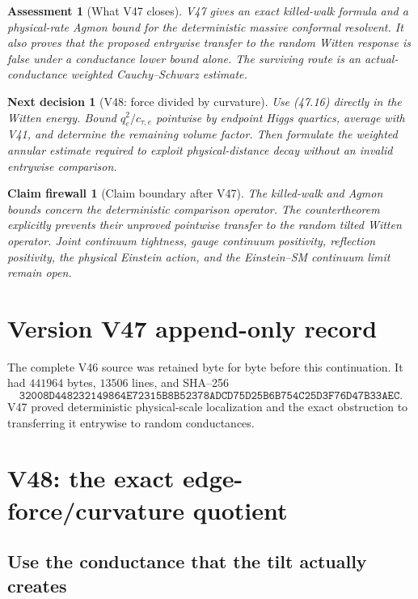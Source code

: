 \documentclass[11pt]{article}
\newtheorem{firewall}[theorem]{Claim firewall}
\newtheorem{decision}[theorem]{Next decision}
\newtheorem{assessment}[theorem]{Assessment}
\theoremstyle{remark}
\begin{document}
\begin{assessment}[What V47 closes]
\label{ass:v17v47-status}
V47 gives an exact killed-walk formula and a physical-rate Agmon bound
for the deterministic massive conformal resolvent.  It also proves
that the proposed entrywise transfer to the random Witten response is
false under a conductance lower bound alone.  The surviving route is
an actual-conductance weighted Cauchy--Schwarz estimate.
\end{assessment}

\begin{decision}[V48: force divided by curvature]
\label{dec:v17v47-next}
Use (47.16) directly in the Witten energy.  Bound
\(q_e^2/c_{\tau,e}\) pointwise by endpoint Higgs quartics, average with
V41, and determine the remaining volume factor.  Then formulate the
weighted annular estimate required to exploit physical-distance decay
without an invalid entrywise comparison.
\end{decision}

\begin{firewall}[Claim boundary after V47]
\label{fire:v17v47}
The killed-walk and Agmon bounds concern the deterministic comparison
operator.  The countertheorem explicitly prevents their unproved
pointwise transfer to the random tilted Witten operator.  Joint
continuum tightness, gauge continuum positivity, reflection
positivity, the physical Einstein action, and the Einstein--SM
continuum limit remain open.
\end{firewall}

\section*{Version V47 append-only record}
The complete V46 source was retained byte for byte before this
continuation.  It had \(441964\) bytes, \(13506\) lines, and SHA--256
\[
 \texttt{32008D448232149864E72315B8B52378ADCD75D25B6B754C25D3F76D47B33AEC}.
\]
V47 proved deterministic physical-scale localization and the exact
obstruction to transferring it entrywise to random conductances.


\section{V48: the exact edge-force/curvature quotient}
\label{sec:v17v48}

\subsection{Use the conductance that the tilt actually creates}
\end{document}
